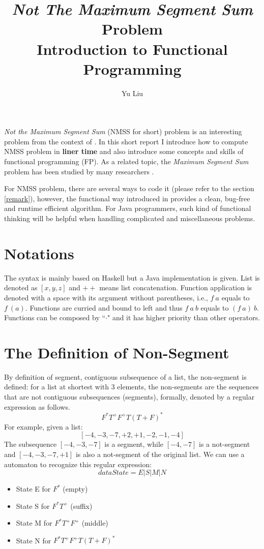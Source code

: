 \documentclass[10pt,a4paper]{article}
\author{Yu Liu}
\title{\textsl{Not The Maximum Segment Sum} Problem \\ Introduction to Functional Programming}
\newcommand{\concat}{\mathbin{+\!\!+}}
\begin{document}
\maketitle

\textsl{Not the Maximum Segment Sum} (NMSS for short) problem is an interesting problem from the context of \cite{Bird}.
In this short report I introduce how to compute NMSS problem in \textbf{liner time} and also introduce some concepts and skills of functional programming (FP). As a related topic, the \textsl{Maximum Segment Sum} problem has been studied by many researchers \cite{Cole93,HuIT96d,MMMH07}.

For NMSS problem, there are several ways to code it (please refer to the section \ref{remark}), however, the functional way introduced in \cite{Bird} provides a clean, bug-free and runtime efficient algorithm. For Java programmers, such kind of functional thinking will be helpful when 
handling complicated and miscellaneous problems.

\section{Notations}
The syntax is mainly based on Haskell but a Java implementation is given.
List is denoted as  \([x,y,z]\) and $\concat$ means list concatenation. 
Function application is denoted with a space with its argument without parentheses, i.e., \(f~a\) equals to \(f~(a)\). 
Functions are curried and bound to left and thus \(f~a~b\) equals to \((f~a)~b\).
Functions can be composed by ``$\cdot$" and it has higher priority than other operators.
\section{The Definition of Non-Segment}
By definition of segment, contiguous subsequence of a list,
the non-segment is defined: for a list at shortest with 3 elements, the non-segments are 
the sequences that are not contiguous subsequences (segments), formally, denoted by a regular expression
 as follows.
\[
F^*T^+F^+T(T+F)^*
\]
For example, given a list:
\[
[-4,-3,-7,+2,+1,-2,-1,-4]
\] 
The subsequence \([-4,-3,-7]\) is a segment, while \([-4,-7]\) is a not-segment and \([-4,-3,-7, +1]\) is also a not-segment of the original list.
We can use a automaton to recognize this regular expression:
\[
data State = E|S|M|N
\]
\begin{itemize}
	\item State E for \( F^*\) (empty)
	\item State S for \( F^*T^+\) (suffix)
	\item State M for \( F^*T^+F^+\) (middle)
	\item State N for \( F^*T^+F^+T(T+F)^*\)
\end{itemize}
\end{document}
